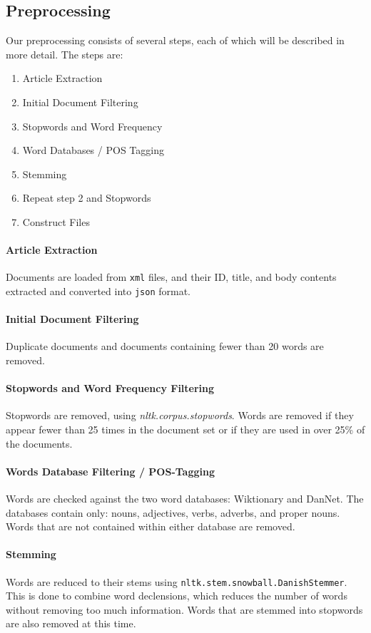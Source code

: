 \subsection{Preprocessing}\label{subsec:prepro}

Our preprocessing consists of several steps, each of which will be described in more detail.
The steps are:
\begin{enumerate}
	\item Article Extraction
	\item Initial Document Filtering
	\item Stopwords and Word Frequency
	\item Word Databases / POS Tagging
	\item Stemming
	\item Repeat step 2 and Stopwords
	\item Construct Files
\end{enumerate}

\paragraph{Article Extraction}
Documents are loaded from \texttt{xml} files, and their ID, title, and body contents extracted and converted into \texttt{json} format.

\paragraph{Initial Document Filtering}
Duplicate documents and documents containing fewer than 20 words are removed.

\paragraph{Stopwords and Word Frequency Filtering}
Stopwords are removed, using \emph{nltk.corpus.stopwords}. 
Words are removed if they appear fewer than 25 times in the document set or if they are used in over 25\% of the documents.

\paragraph{Words Database Filtering / POS-Tagging}
Words are checked against the two word databases: Wiktionary and DanNet. 
The databases contain only: nouns, adjectives, verbs, adverbs, and proper nouns. 
Words that are not contained within either database are removed.

\paragraph{Stemming}
Words are reduced to their stems using \texttt{nltk.stem.snowball.DanishStemmer}. 
This is done to combine word declensions, which reduces the number of words without removing too much information.
Words that are stemmed into stopwords are also removed at this time.

